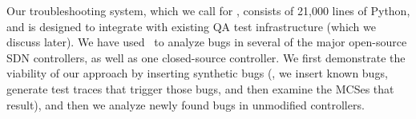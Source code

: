 Our troubleshooting system, which we call {\projectname} for \projectmeaning,
consists of 21,000 lines of Python, and is designed to
integrate with existing QA test infrastructure (which we discuss later). We
have used \projectname~to analyze bugs in \num{several} of the major open-source SDN
controllers, as well as one closed-source controller. We first demonstrate the
viability of our approach by inserting synthetic bugs (\ie, we insert known
bugs, generate test traces that trigger those bugs, and then examine the MCSes that
result), and then we analyze newly found bugs in unmodified controllers.
